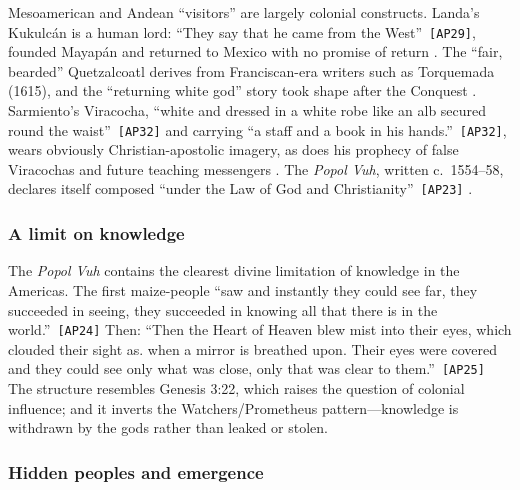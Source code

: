 \documentclass[11pt,a4paper]{article}
\newcommand{\pid}[1]{\texttt{\small #1}}
\begin{document}
Mesoamerican and Andean ``visitors'' are largely colonial constructs. Landa's Kukulcán is a human lord: \enquote{They say that he came from the West}~\pid{[AP29]}, founded Mayapán and returned to Mexico with no promise of return \parencite{landa1937yucatan}. The ``fair, bearded'' Quetzalcoatl derives from Franciscan-era writers such as Torquemada (1615), and the ``returning white god'' story took shape after the Conquest \parencite{townsend2003burying}. Sarmiento's Viracocha, \enquote{white and dressed in a white robe like an alb secured round the waist}~\pid{[AP32]} and carrying \enquote{a staff and a book in his hands.}~\pid{[AP32]}, wears obviously Christian-apostolic imagery, as does his prophecy of false Viracochas and future teaching messengers \parencite{sarmiento1907history}. The \emph{Popol Vuh}, written c.~1554--58, declares itself composed \enquote{under the Law of God and Christianity}~\pid{[AP23]} \parencite{goetz1950popol}.

\subsubsection{A limit on knowledge}

The \emph{Popol Vuh} contains the clearest divine limitation of knowledge in the Americas. The first maize-people \enquote{saw and instantly they could see far, they succeeded in seeing, they succeeded in knowing all that there is in the world.}~\pid{[AP24]} Then: \enquote{Then the Heart of Heaven blew mist into their eyes, which clouded their sight as. when a mirror is breathed upon. Their eyes were covered and they could see only what was close, only that was clear to them.}~\pid{[AP25]} The structure resembles Genesis 3:22, which raises the question of colonial influence; and it inverts the Watchers/Prometheus pattern---knowledge is withdrawn by the gods rather than leaked or stolen.

\subsubsection{Hidden peoples and emergence}
\end{document}
